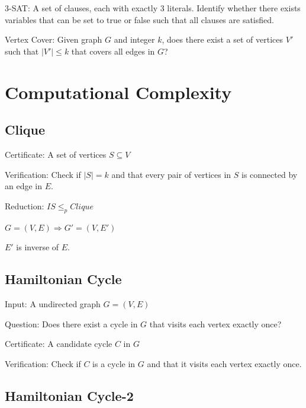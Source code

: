 \documentclass[12pt,a4paper]{article}
\begin{document}
3-SAT: A set of clauses, each with exactly 3 literals. Identify whether there exists variables that can be set to true or false such that all clauses are satisfied.

Vertex Cover: Given graph $G$ and integer $k$, does there exist a set of vertices $V'$ such that $|V'| \leq k$ that covers all edges in $G$? 

\section*{Computational Complexity}

\subsection*{Clique}

Certificate: A set of vertices $S \subseteq V$ 

Verification: Check if $|S| = k$ and that every pair of vertices in $S$ is connected by an edge in $E$.

Reduction: $IS \leq_p Clique$

$G = (V, E) \Rightarrow G' = (V, E')$

$E'$ is inverse of $E$.

\subsection*{Hamiltonian Cycle}

Input: A undirected graph $G = (V, E)$

Question: Does there exist a cycle in $G$ that visits each vertex exactly once?

Certificate: A candidate cycle $C$ in $G$

Verification: Check if $C$ is a cycle in $G$ and that it visits each vertex exactly once.

\subsection*{Hamiltonian Cycle-2}
\end{document}
